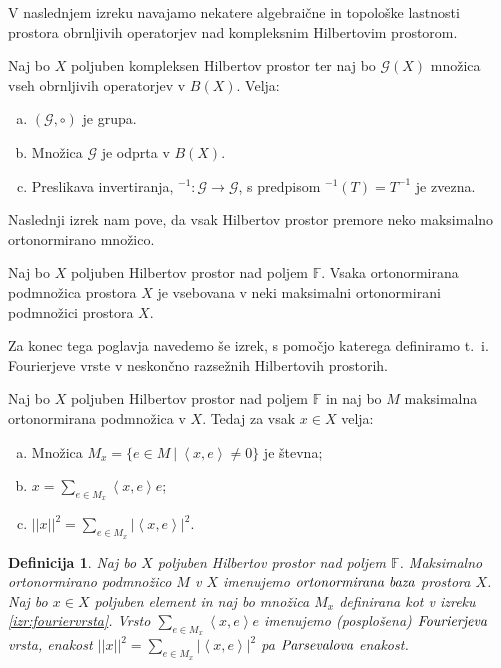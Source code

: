 \documentclass[12pt,a4paper,oneside,fleqn,openany]{book}
\newtheorem{definicija}[izrek]{Definicija}
\newcommand{\F}{\mathbb{F}}
\newcommand{\abs}[1]{\ensuremath{\lvert #1 \rvert}}
\newcommand{\norm}[1]{\abs{\abs{#1}}}
\newcommand{\pojem}[1]{\ensuremath{\emph{#1}}}
\newcommand{\Sp}[2]{\ensuremath{\left<#1, #2\right>}}
\newcommand{\map}[3]{\ensuremath{{#1}:{#2}\rightarrow{#3}}}
\begin{document}
V naslednjem izreku navajamo nekatere algebraične in topološke lastnosti prostora obrnljivih operatorjev nad kompleksnim Hilbertovim prostorom.
\begin{izrek}
	\label{izr:Hilbertinvset}
	Naj bo $X$ poljuben kompleksen Hilbertov prostor ter naj bo $\mathcal{G}(X)$ množica vseh obrnljivih operatorjev v $B(X)$. Velja: \begin{enumerate}[a)]
		\item $(\mathcal{G}, \circ)$ je grupa.
		\item Množica $\mathcal{G}$ je odprta v $B(X)$.
		\item Preslikava invertiranja, $\map{^{-1}}{\mathcal{G}}{\mathcal{G}}$, s predpisom $^{-1}(T) = T^{-1}$ je zvezna.
	\end{enumerate}
\end{izrek}
Naslednji izrek nam pove, da vsak Hilbertov prostor premore neko maksimalno ortonormirano množico.
\begin{izrek}
	\label{izr:ortogbaza}
	Naj bo $X$ poljuben Hilbertov prostor nad poljem $\F$. Vsaka ortonormirana podmnožica prostora $X$ je vsebovana v neki maksimalni ortonormirani podmnožici prostora $X$.
\end{izrek}
Za konec tega poglavja navedemo še izrek, s pomočjo katerega definiramo t.~i.~ Fourierjeve vrste v neskončno razsežnih Hilbertovih prostorih.
\begin{izrek}
	\label{izr:fouriervrsta}
	Naj bo $X$ poljuben Hilbertov prostor nad poljem $\F$ in naj bo $M$ maksimalna ortonormirana podmnožica v $X$. Tedaj za vsak $x\in X$ velja: \begin{enumerate}[a)]
		\item Množica $M_x = \{e\in M~|~ \Sp{x}{e}\neq 0\}$ je števna;
		\item $x = \displaystyle\sum_{e\in M_x} \Sp{x}{e}e$;
		\item $\norm{x}^2 = \displaystyle\sum_{e\in M_x}\abs{\Sp{x}{e}}^2$.
	\end{enumerate}
\end{izrek}

\begin{definicija}
	\label{def:ortogbaz}
	Naj bo $X$ poljuben Hilbertov prostor nad poljem $\F$. Maksimalno ortonormirano podmnožico $M$ v $X$ imenujemo \pojem{ortonormirana baza} prostora $X$. Naj bo $x\in X$ poljuben element in naj bo množica $M_x$ definirana kot v izreku \ref{izr:fouriervrsta}. Vrsto $\sum_{e\in M_x}\Sp{x}{e}e$ imenujemo (posplošena) \pojem{Fourierjeva} vrsta, enakost $\norm{x}^2 = \sum_{e\in M_x}\abs{\Sp{x}{e}}^2$ pa \pojem{Parsevalova} enakost.
\end{definicija}
\end{document}
